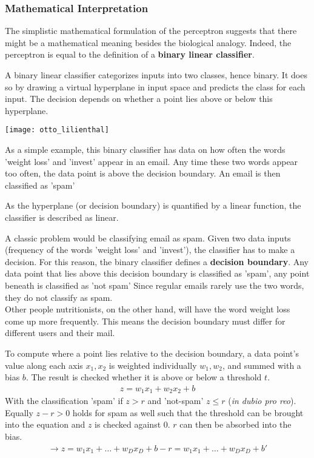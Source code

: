 \subsubsection{Mathematical Interpretation}
The simplistic mathematical formulation of the perceptron suggests that there might be a mathematical meaning besides the biological analogy.
Indeed, the perceptron is equal to the definition of a \textbf{binary linear classifier}.

A binary linear classifier categorizes inputs into two classes, hence binary.
It does so by drawing a virtual hyperplane in input space and predicts the class for each input.
The decision depends on whether a point lies above or below this hyperplane.
\begin{marginfigure}
    \texttt{[image: otto\_lilienthal]}
    \caption[]{As a simple example, this binary classifier has data on how often the words 'weight loss' and 'invest' appear in an email.
Any time these two words appear too often, the data point is above the decision boundary. An email is then classified as 'spam'}
\end{marginfigure}
As the hyperplane (or decision boundary) is quantified by a linear function, the classifier is described as linear.

A classic problem would be classifying email as spam.
Given two data inputs (\ie frequency of the words 'weight loss' and 'invest'), the classifier has to make a decision.
For this reason, the binary classifier defines a \textbf{decision boundary}.
Any data point that lies above this decision boundary is classified as 'spam', any point beneath is classified as 'not spam'
Since regular emails rarely use the two words, they do not classify as spam.\\
Other people \ie nutritionists, on the other hand, will have the word weight loss come up more frequently.
This means the decision boundary must differ for different users and their mail.

To compute where a point lies relative to the decision boundary, a data point's value along each axis $x_1, x_2$ is weighted individually $w_1, w_2$, and summed with a bias $b$.
The result is checked whether it is above or below a threshold $t$.
\begin{align}
    z = w_1 x_1 + w_2 x_2 + b
\end{align}
With the classification 'spam' if $z > r$ and 'not-spam' $z \leq r$ (\textit{in dubio pro reo}).
Equally $z - r > 0$ holds for spam as well such that the threshold can be brought into the equation and $z$ is checked against $0$.
$r$ can then be absorbed into the bias.
\begin{align}
    \rightarrow z = w_1 x_1 + \hdots + w_D x_D + b - r = w_1 x_1 + \hdots + w_D x_D + b'
\end{align}

